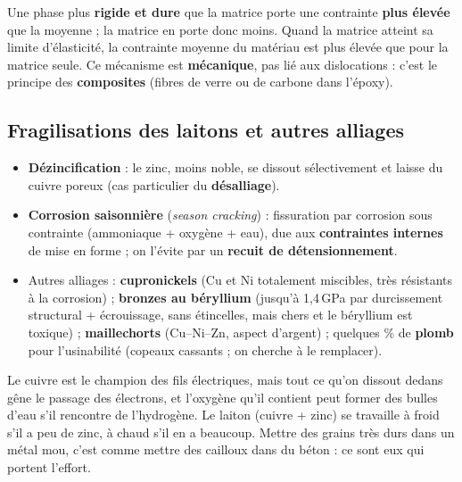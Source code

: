 
\begin{thmbox}[title={Durcissement par une seconde phase dure (renfort)}]
Une phase plus \textbf{rigide et dure} que la matrice porte une contrainte \textbf{plus élevée}
que la moyenne ; la matrice en porte donc moins. Quand la matrice atteint sa limite
d'élasticité, la contrainte moyenne du matériau est plus élevée que pour la matrice seule.
Ce mécanisme est \textbf{mécanique}, pas lié aux dislocations : c'est le principe des
\textbf{composites} (fibres de verre ou de carbone dans l'époxy).
\end{thmbox}

\subsection*{Fragilisations des laitons et autres alliages}

\begin{itemize}
  \item \textbf{Dézincification} : le zinc, moins noble, se dissout sélectivement et laisse
        du cuivre poreux (cas particulier du \textbf{désalliage}).
  \item \textbf{Corrosion saisonnière} (\emph{season cracking}) : fissuration par corrosion
        sous contrainte (ammoniaque + oxygène + eau), due aux \textbf{contraintes internes} de
        mise en forme ; on l'évite par un \textbf{recuit de détensionnement}.
  \item Autres alliages : \textbf{cupronickels} (Cu et Ni totalement miscibles, très résistants
        à la corrosion) ; \textbf{bronzes au béryllium} (jusqu'à 1,4\,GPa par durcissement
        structural + écrouissage, sans étincelles, mais chers et le béryllium est toxique) ;
        \textbf{maillechorts} (Cu--Ni--Zn, aspect d'argent) ; quelques \% de \textbf{plomb}
        pour l'usinabilité (copeaux cassants ; on cherche à le remplacer).
\end{itemize}

\begin{goatbox}
Le cuivre est le champion des fils électriques, mais tout ce qu'on dissout dedans gêne le passage
des électrons, et l'oxygène qu'il contient peut former des bulles d'eau s'il rencontre de
l'hydrogène. Le laiton (cuivre + zinc) se travaille à froid s'il a peu de zinc, à chaud s'il en
a beaucoup. Mettre des grains très durs dans un métal mou, c'est comme mettre des cailloux dans
du béton : ce sont eux qui portent l'effort.
\end{goatbox}

